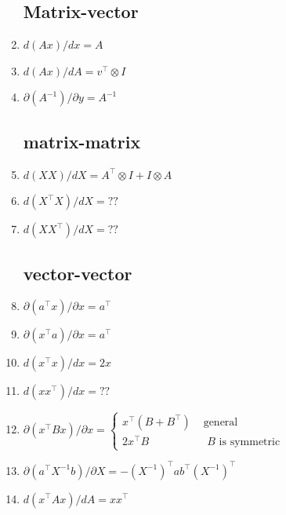 \begin{enumerate}[itemsep=0.2cm]
    \subsection{Matrix-vector}
    
    \item \( d(Ax)/dx = A \)

    \item $d(Ax)/dA = v^\top\otimes I $
    
    \item \( \partial (A^{-1})/\partial y = A^{-1}\)

    \subsection{matrix-matrix}
    \item \(
        d(XX)/dX = A^\top \otimes I+I\otimes A
    \)
    
    \item  $d(X^\top X)/dX = ??$
    
    \item  $d(XX^\top )/dX = ??$

    \subsection{vector-vector}
    \item  $\partial (a^\top x)/\partial x = a^\top$

    \item $\partial (x^\top a)/\partial x = a^\top$

    \item  $d(x^\top x)/dx = 2x$

    \item  $d(xx^\top)/dx = ??$

    \item  \(
        \partial (x^\top Bx)/\partial x = \begin{cases}
            x^\top(B + B^\top) & \text{ general}\\
            2x^\top B & \text{ $B$ is symmetric}
        \end{cases}
    \)

    \item  $\partial (a^\top X^{-1}b)/\partial X = -(X^{-1})^\top ab^\top (X^{-1})^\top$

    \item  $d(x^\top Ax)/dA = xx^\top $


\end{enumerate}
